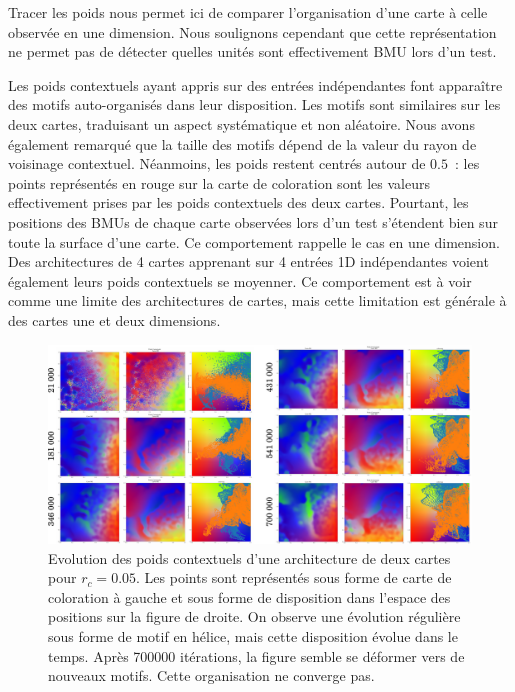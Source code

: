 \documentclass[../main]{subfiles}
\begin{document}
Tracer les poids nous permet ici de comparer l'organisation d'une carte à celle observée en une dimension. Nous soulignons cependant que cette représentation ne permet pas de détecter quelles unités sont effectivement BMU lors d'un test.

Les poids contextuels ayant appris sur des entrées indépendantes font apparaître des motifs auto-organisés dans leur disposition. Les motifs sont similaires sur les deux cartes, traduisant un aspect systématique et non aléatoire. Nous avons également remarqué que la taille des motifs dépend de la valeur du rayon de voisinage contextuel.
Néanmoins, les poids restent centrés autour de $0.5$~: les points représentés en rouge sur la carte de coloration sont les valeurs effectivement prises par les poids contextuels des deux cartes. Pourtant, les positions des BMUs de chaque carte observées lors d'un test s'étendent bien sur toute la surface d'une carte.
Ce comportement rappelle le cas en une dimension. Des architectures de 4 cartes apprenant sur 4 entrées 1D indépendantes voient également leurs poids contextuels se moyenner. Ce comportement est à voir comme une limite des architectures de cartes, mais cette limitation est générale à des cartes une et deux dimensions.

\begin{figure}
\includegraphics[width=\textwidth]{sphere_rc005_evol_landscape}
\caption{Evolution des poids contextuels d'une architecture de deux cartes pour $r_c =0.05$. Les points sont représentés sous forme de carte de coloration à gauche et sous forme de disposition dans l'espace des positions sur la figure de droite. On observe une évolution régulière sous forme de motif en hélice, mais cette disposition évolue dans le temps. Après 700000 itérations, la figure semble se déformer vers de nouveaux motifs. Cette organisation ne converge pas.}
\end{figure}
\end{document}
